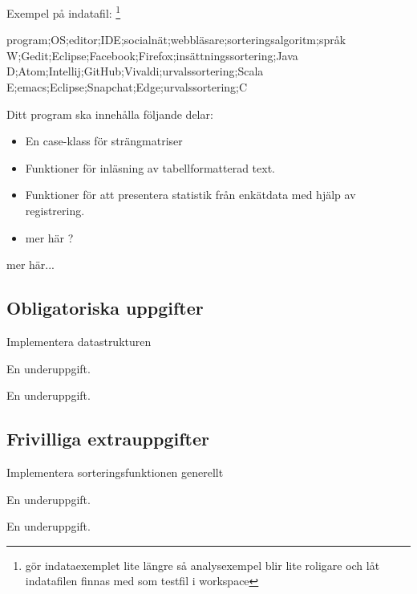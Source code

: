 Exempel på indatafil: \footnote{\TODO gör indataexemplet lite längre så analysexempel blir lite roligare och låt indatafilen finnas med som testfil i workspace}
\begin{CodeSmall}[language=, ]
program;OS;editor;IDE;socialnät;webbläsare;sorteringsalgoritm;språk
W;Gedit;Eclipse;Facebook;Firefox;insättningssortering;Java
D;Atom;Intellij;GitHub;Vivaldi;urvalssortering;Scala
E;emacs;Eclipse;Snapchat;Edge;urvalssortering;C
\end{CodeSmall}

Ditt program ska innehålla följande delar:
\begin{itemize}
\item En case-klass för strängmatriser 
\item Funktioner för inläsning av tabellformatterad text.
\item Funktioner för att presentera statistik från enkätdata med hjälp av registrering.
\item \TODO mer här ?
\end{itemize}

\TODO mer här...

\subsection{Obligatoriska uppgifter}

\Task Implementera datastrukturen

\Subtask En underuppgift.

\Subtask En underuppgift.

\subsection{Frivilliga extrauppgifter}

\Task Implementera sorteringsfunktionen generellt

\Subtask En underuppgift.

\Subtask En underuppgift.
    